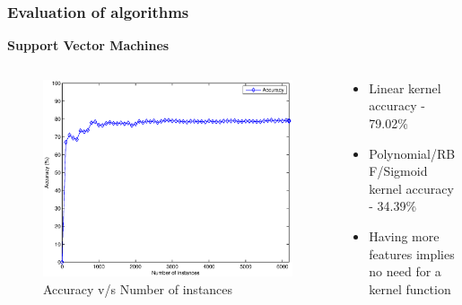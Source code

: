 \documentclass{beamer}
\begin{document}
    \begin{frame}
        \frametitle{Evaluation of algorithms}
        \begin{center}
            \textbf{Support Vector Machines}
        \end{center}
        \begin{columns}
            \begin{column}{0.5\textwidth}
                \begin{figure}
                    \centering
                    \includegraphics[width=\textwidth]{figures/svm_accuracy.eps}
                    \caption{Accuracy v/s Number of instances}
                \end{figure}
            \end{column}
            \begin{column}{0.5\textwidth}
                \begin{itemize}
                    \item{Linear kernel accuracy - 79.02\%}
                    \item{Polynomial/RBF/Sigmoid kernel accuracy - 34.39\%}
                    \item{Having more features implies no need for a kernel function}
                \end{itemize}
            \end{column}
        \end{columns}
    \end{frame}
    
\end{document}
